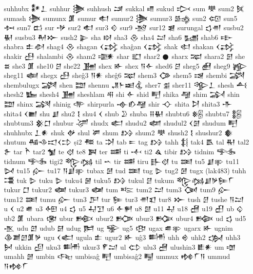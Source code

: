  suhhubx  𒀯𒁇    
 suhhur  𒋦   
 suhhush  𒁼   
 sukkal  𒈛   
 sukud  𒃴   
 sum  𒋧   
 sum2  𒍮   
 sumash  𒋨   
 sumunx  𒂠   
 sumur  𒊨   
 sumur2  𒋦   
 sumur3  𒈰   
 sun2  𒄢   
 sun5  𒁔   
 sun7  𒆗   
 sur  𒋩   
 sur2  𒊨   
 sur3  𒄮   
 sur9  𒋪   
 sur12  𒇭   
 surungal  𒌓𒉣    
 susbu2  𒈽   
 susbu3  𒈹𒁍    
 sush2  𒉌   
 sha  𒊭   
 sha3  𒊮   
 sha4  𒁺   
 sha6  𒊷   
 shab6  𒊸   
 shabra  𒉺𒀠    
 shag4  𒊮   
 shagan  𒌋𒃶    
 shaĝan  𒌋𒃶    
 shak  𒊕   
 shakan  𒌋𒃶    
 shakir  𒍀   
 shalambi  𒊮   
 sham2  𒉛   
 shar  𒊬   
 shar2  𒊹   
 sharx  𒉈   
 shara2  𒇋   
 she  𒊺   
 she3  𒂠   
 she10  𒆪   
 she22  𒂞   
 shex  𒅊   
 shex  𒀀𒅆    
 shed6  𒆪   
 sheg5  𒍋   
 sheg9  𒊾   
 sheg11  𒅝   
 shegx  𒍀   
 sheĝ3  𒀀𒀭    
 sheĝ6  𒉈   
 shem3  𒀚   
 shem5  𒀎   
 shembi  𒋍   
 shembulugx  𒋎   
 shen  𒊿   
 shennu  𒂗𒈨𒀜𒆬    
 sher7  𒉪   
 sher11  𒄊𒁇    
 shesh  𒋀   
 shesh2  𒋁   
 shesh4  𒂞   
 sheshlam  𒋂   
 shi  𒅆   
 shid  𒋃   
 shika  𒆷   
 shim  𒋆   
 shin  𒊿   
 shinx  𒋋   
 shinig  𒋒   
 shirpurla   𒉢𒁓𒆷   
 shir  𒋓   
 shita  𒋖   
 shita3  𒋥   
 shita4  𒌋𒆤    
 shu  𒋗   
 shu2  𒋙   
 shu4  𒌋   
 shub  𒊒   
 shuba  𒍝𒈽    
 shubtu6  𒆝   
 shubtu7  𒆞   
 shubtum3  𒆜𒆸    
 shubur  𒋚   
 shudx  𒅗   
 shudu2  𒆃   
 shudul2  𒌋𒌆    
 shudum  𒋃   
 shuhhubx  𒁇𒀭    
 shuk  𒉻   
 shul  𒂄   
 shum  𒋳   
 shum2  𒋧   
 shush2  𒋙   
 shushur2  𒀽   
 shutum  𒄀𒈾𒀊𒌋𒄞    
 ṣi2  𒍣   
 ta  𒋫   
 tab  𒋰   
 tag  𒋳   
 tahh  𒈭   
 tak4  𒋺   
 tal  𒊑   
 tal2  𒉿   
 tar  𒋻   
 tar2  𒁯   
 te  𒋼   
 te8  𒀉   
 ter  𒌁   
 ti  𒋾   
 ti2  𒎗   
 tibir  𒋳   
 tidnim  𒊎   
 tidnum  𒊎   
 tigi2  𒈜𒁆    
 til  𒌀   
 tir  𒌁   
 tiru  𒃲𒋼    
 tu  𒌅   
 tu5  𒋗𒉀    
 tu11  𒄸   
 tu15  𒅎   
 tu17  𒀀𒋗𒉀    
 tubax  𒌆   
 tud  𒌅   
 tug  𒌇   
 tug2  𒌆   
 tugx  (lak483)   
 tuhh  𒂃   
 tuk  𒌇   
 tuku  𒌇   
 tuku4  𒇧   
 tuku5  𒋳   
 tukul  𒆪   
 tukum  𒈜𒁆𒋗𒃻𒌉𒇲    
 tukur  𒆸   
 tukur2  𒆁   
 tukur3  𒆈   
 tum  𒌈   
 tum2  𒁺   
 tum3  𒉐   
 tum9  𒅎   
 tum12  𒌅   
 tumu  𒅎   
 tun3  𒂅   
 tur  𒌉   
 tur3  𒉣𒇬    
 tur8  𒁍   
 tush  𒆪   
 tushe  𒀀𒁺    
 u  𒌋   
 u2  𒌑   
 u3  𒅇   
 u4  𒌓   
 u5  𒄷𒋛    
 u6  𒅆𒂍    
 u8  𒇇   
 u11  𒄷   
 u18  𒍇   
 u19  𒌷   
 ub  𒌒   
 ub2  𒂠   
 ubara  𒂬   
 ubur  𒁛   
 ubur2  𒁥   
 ubur3  𒁡   
 ubur4  𒁢   
 ud  𒌓   
 ud5  𒍚   
 udu  𒇻   
 udub  𒇛   
 udug  𒌜   
 ug  𒊌   
 ug5  𒂦   
 ugax  𒌑𒉀    
 ugarx  𒅊   
 ugnim  𒆠𒋢𒇻𒂠𒃻    
 ugu  𒌋𒅗    
 ugula  𒉺   
 ugur2  𒅊   
 uĝ3  𒌦   
 uhh  𒄴   
 uhh2  𒌔   
 uhh3  𒆵   
 ukkin  𒌺   
 uku3  𒌦   
 ukur3  𒇳𒁺    
 ul  𒌌   
 ulu3  𒍇   
 ulushin3  𒀾𒀭    
 um  𒌝   
 umahh  𒇦   
 umbin  𒌢   
 umbisaĝ  𒋃   
 umbisaĝ2  𒋄   
 ummux  𒂔𒇲𒀀    
 ummud  𒀀𒂔𒇲    
